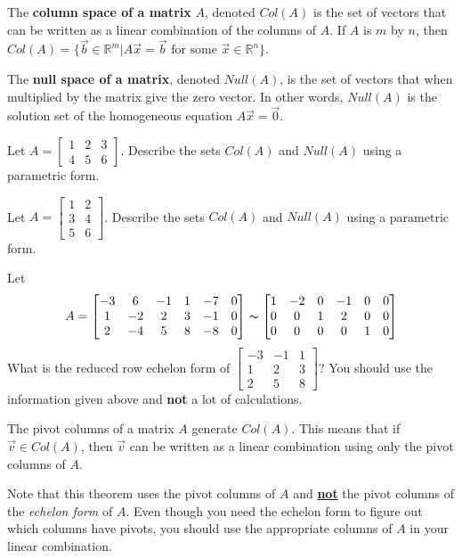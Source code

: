 \begin{definition} The \textbf{column space of a matrix} $A$, denoted $Col(A)$ is the set of vectors that can be written as a linear combination of the columns of $A$. If $A$ is $m$ by $n$, then $Col(A)=\{\vec{b} \in \mathbb{R}^m | A\vec{x} =\vec{b} \mbox{ for some } \vec{x} \in \mathbb{R}^n \}$.
\end{definition}

\begin{definition} The \textbf{null space of a matrix}, denoted $Null(A)$, is the set of vectors that when multiplied by the matrix give the zero vector. In other words, $Null(A)$ is the solution set of the homogeneous equation $A\vec{x}=\vec{0}$.
\end{definition}

\bq Let $A=\begin{bmatrix} 1&2&3 \\4&5&6 \end{bmatrix}$. Describe the sets $Col(A)$ and $Null(A)$ using a parametric form.
\eq

\bq Let $A=\begin{bmatrix} 1&2\\ 3&4\\5&6 \end{bmatrix}$. Describe the sets $Col(A)$ and $Null(A)$ using a parametric form.
\eq

\bq Let $$A=\begin{bmatrix} -3&6&-1&1&-7&0 \\1&-2&2&3&-1&0 \\2&-4&5&8&-8&0 \end{bmatrix}  \thicksim \begin{bmatrix} 1&-2&0&-1&0&0\\0&0&1&2&0&0 \\ 0&0&0&0&1&0 \end{bmatrix}$$
What is the reduced row echelon form of $\begin{bmatrix} -3&-1&1 \\1&2&3 \\2&5&8\end{bmatrix}$? You should use the information given above and \textbf{not} a lot of calculations.
\eq

\begin{theorem} The pivot columns of a matrix $A$ generate $Col(A)$. This means that if $\vec{v} \in Col(A)$, then $\vec{v}$ can be written as a linear combination using only the pivot columns of $A$.
\end{theorem}
Note that this theorem uses the pivot columns of $A$ and \underline{\textbf{not}} the pivot columns of the \emph{echelon form} of $A$. Even though you need the echelon form to figure out which columns have pivots, you should use the appropriate columns of $A$ in your linear combination.

